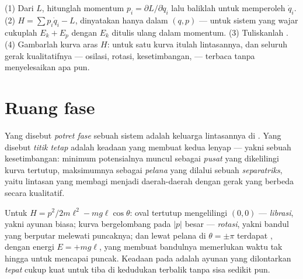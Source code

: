 \begin{method}\label{met:b3:hamiltonian-mechanics:recipe}
(1) Dari $L$, hitunglah momentum $p_i = \partial L/\partial\dot q_i$
lalu baliklah untuk memperoleh $\dot q_i$. (2) $H = \sum p_i\dot q_i - L$,
dinyatakan hanya dalam $(q, p)$ --- untuk sistem yang wajar cukuplah
$E_k + E_p$ dengan $E_k$ ditulis ulang dalam momentum. (3) Tuliskanlah
. (4) Gambarlah kurva aras $H$: untuk satu  kurva itulah lintasannya, dan seluruh gerak kualitatifnya ---
osilasi, rotasi, kesetimbangan,  --- terbaca tanpa
menyelesaikan apa pun.
\end{method}

\section{Ruang fase}

\begin{definition}\label{def:b3:hamiltonian-mechanics:portrait}
Yang disebut \emph{potret fase} sebuah sistem adalah keluarga
lintasannya di . Yang disebut \emph{titik tetap} adalah
keadaan yang membuat kedua  lenyap --- yakni sebuah
kesetimbangan: minimum potensialnya muncul sebagai \emph{pusat} yang
dikelilingi kurva tertutup, maksimumnya sebagai \emph{pelana} yang
dilalui sebuah \emph{separatriks}, yaitu lintasan yang membagi  menjadi daerah-daerah dengan gerak yang berbeda secara kualitatif.
\end{definition}

\begin{example}\label{ex:b3:hamiltonian-mechanics:pendulum-portrait}
Untuk $H = p^2/2m\ell^2 - mg\ell\cos\theta$: oval tertutup mengelilingi
$(0, 0)$ --- \emph{librasi}, yakni ayunan biasa; kurva bergelombang pada
$|p|$ besar --- \emph{rotasi}, yakni bandul yang berputar melewati
puncaknya; dan lewat pelana di $\theta = \pm\pi$ terdapat ,
dengan energi $E = +mg\ell$, yang membuat bandulnya memerlukan waktu tak
hingga untuk mencapai puncak. Keadaan pada  adalah ayunan
yang dilontarkan \emph{tepat} cukup kuat untuk tiba di kedudukan
terbalik tanpa sisa sedikit pun.
\end{example}

